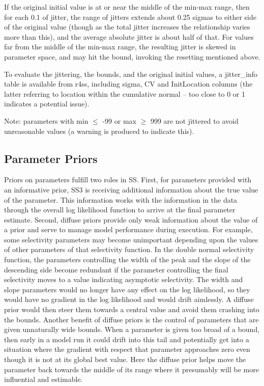 If the original initial value is at or near the middle of the min-max range, then for each 0.1 of jitter, the range of jitters extends about 0.25 sigmas to either side of the original value (though as the total jitter increases the relationship varies more than this), and the average absolute jitter is about half of that.  For values far from the middle of the min-max range, the resulting jitter is skewed in parameter space, and may hit the bound, invoking the resetting mentioned above. 

To evaluate the jittering, the bounds, and the original initial values, a jitter\_info table is available from r4ss, including sigma, CV and InitLocation columns (the latter referring to location within the cumulative normal – too close to 0 or 1 indicates a potential issue).

Note: parameters with min $\leq$ -99 or max $\geq$ 999 are not jittered to avoid unreasonable values (a warning is produced to indicate this).

\hypertarget{PriorDescrip}{}
\subsection{Parameter Priors}
Priors on parameters fulfill two roles in SS.  First, for parameters provided with an informative prior, SS3 is receiving additional information about the true value of the parameter.  This information works with the information in the data through the overall log likelihood function to arrive at the final parameter estimate.  Second, diffuse priors provide only weak information about the value of a prior and serve to manage model performance during execution.  For example, some selectivity parameters may become unimportant depending upon the values of other parameters of that selectivity function.  In the double normal selectivity function, the parameters controlling the width of the peak and the slope of the descending side become redundant if the parameter controlling the final selectivity moves to a value indicating asymptotic selectivity.  The width and slope parameters would no longer have any effect on the log likelihood, so they would have no gradient in the log likelihood and would drift aimlessly.  A diffuse prior would then steer them towards a central value and avoid them crashing into the bounds.  Another benefit of diffuse priors is the control of parameters that are given unnaturally wide bounds.  When a parameter is given too broad of a bound, then early in a model run it could drift into this tail and potentially get into a situation where the gradient with respect that parameter approaches zero even though it is not at its global best value.  Here the diffuse prior helps move the parameter back towards the middle of its range where it presumably will be more influential and estimable.  

